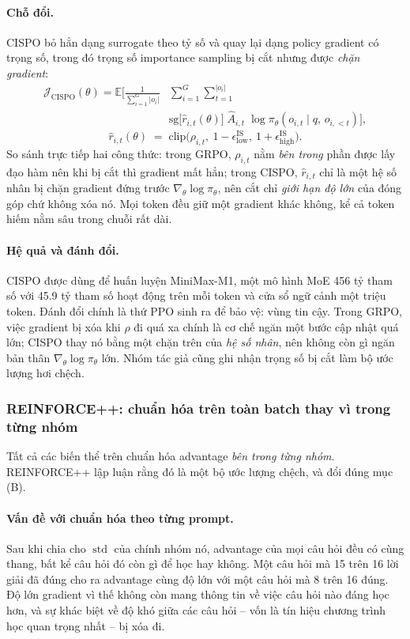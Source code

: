 \paragraph{Chỗ đổi.}
CISPO bỏ hẳn dạng surrogate theo tỷ số và quay lại dạng policy gradient có trọng số, trong đó trọng số importance sampling bị cắt nhưng được \emph{chặn gradient}:
\[
\begin{aligned}
\mathcal{J}_{\mathrm{CISPO}}(\theta) = \mathbb{E}\bigg[\frac{1}{\sum_{i=1}^{G}|o_i|}&\sum_{i=1}^{G}\sum_{t=1}^{|o_i|}\\
&\mathrm{sg}\big[\hat{r}_{i,t}(\theta)\big]\;\hat{A}_{i,t}\;\log \pi_\theta(o_{i,t}\mid q,\, o_{i,<t})\bigg],
\end{aligned}
\]
\[
\hat{r}_{i,t}(\theta) \;=\; \mathrm{clip}\big(\rho_{i,t},\ 1-\epsilon^{\mathrm{IS}}_{\mathrm{low}},\ 1+\epsilon^{\mathrm{IS}}_{\mathrm{high}}\big).
\]
So sánh trực tiếp hai công thức: trong GRPO, $\rho_{i,t}$ nằm \emph{bên trong} phần được lấy đạo hàm nên khi bị cắt thì gradient mất hẳn; trong CISPO, $\hat{r}_{i,t}$ chỉ là một hệ số nhân bị chặn gradient đứng trước $\nabla_\theta \log\pi_\theta$, nên cắt chỉ \emph{giới hạn độ lớn} của đóng góp chứ không xóa nó. Mọi token đều giữ một gradient khác không, kể cả token hiếm nằm sâu trong chuỗi rất dài.

\paragraph{Hệ quả và đánh đổi.}
CISPO được dùng để huấn luyện MiniMax-M1, một mô hình MoE 456 tỷ tham số với 45.9 tỷ tham số hoạt động trên mỗi token và cửa sổ ngữ cảnh một triệu token. Đánh đổi chính là thứ PPO sinh ra để bảo vệ: vùng tin cậy. Trong GRPO, việc gradient bị xóa khi $\rho$ đi quá xa chính là cơ chế ngăn một bước cập nhật quá lớn; CISPO thay nó bằng một chặn trên của \emph{hệ số nhân}, nên không còn gì ngăn bản thân $\nabla_\theta\log\pi_\theta$ lớn. Nhóm tác giả cũng ghi nhận trọng số bị cắt làm bộ ước lượng hơi chệch.

\subsubsection{REINFORCE++: chuẩn hóa trên toàn batch thay vì trong từng nhóm}

Tất cả các biến thể trên chuẩn hóa advantage \emph{bên trong từng nhóm}. REINFORCE++ \cite{hu2025reinforceplusplus} lập luận rằng đó là một bộ ước lượng chệch, và đổi đúng mục (B).

\paragraph{Vấn đề với chuẩn hóa theo từng prompt.}
Sau khi chia cho $\operatorname{std}$ của chính nhóm nó, advantage của mọi câu hỏi đều có cùng thang, bất kể câu hỏi đó còn gì để học hay không. Một câu hỏi mà 15 trên 16 lời giải đã đúng cho ra advantage cùng độ lớn với một câu hỏi mà 8 trên 16 đúng. Độ lớn gradient vì thế không còn mang thông tin về việc câu hỏi nào đáng học hơn, và sự khác biệt về độ khó giữa các câu hỏi -- vốn là tín hiệu chương trình học quan trọng nhất -- bị xóa đi.


